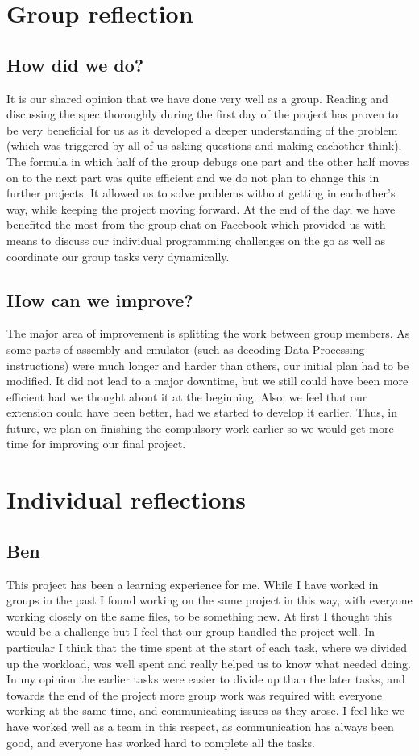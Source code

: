 \documentclass[11pt]{article}
\begin{document}
\section{Group reflection}
\subsection{How did we do?}
It is our shared opinion that we have done very well as a group. Reading and discussing the spec thoroughly during the first day of the project has proven to be very beneficial for us as it developed a deeper understanding of the problem (which was triggered by all of us asking questions and making eachother think). The formula in which half of the group debugs one part and the other half moves on to the next part was quite efficient and we do not plan to change this in further projects. It allowed us to solve problems without getting in eachother's way, while keeping the project moving forward. At the end of the day, we have benefited the most from the group chat on Facebook which provided us with means to discuss our individual programming challenges on the go as well as coordinate our group tasks very dynamically. 
\subsection{How can we improve?}
The major area of improvement is splitting the work between group members. As some parts of assembly and emulator (such as decoding Data Processing instructions) were much longer and harder than others, our initial plan had to be modified. It did not lead to a major downtime, but we still could have been more efficient had we thought about it at the beginning. Also, we feel that our extension could have been better, had we started to develop it earlier. Thus, in future, we plan on finishing the compulsory work earlier so we would get more time for improving our final project.
\section{Individual reflections}

\subsection{Ben}
This project has been a learning experience for me. While I have worked in groups in the past I found working on the same project in this way, with everyone working closely on the same files, to be something new. At first I thought this would be a challenge but I feel that our group handled the project well. In particular I think that the time spent at the start of each task, where we divided up the workload, was well spent and really helped us to know what needed doing. In my opinion the earlier tasks were easier to divide up than the later tasks, and towards the end of the project more group work was required with everyone working at the same time, and communicating issues as they arose. I feel like we have worked well as a team in this respect, as communication has always been good, and everyone has worked hard to complete all the tasks.
\end{document}
